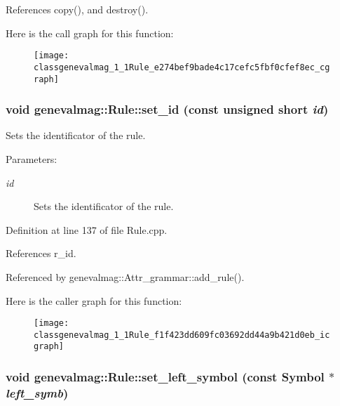 References copy(), and destroy().

Here is the call graph for this function:\nopagebreak
\begin{figure}[H]
\begin{center}
\leavevmode
\texttt{[image: classgenevalmag\_1\_1Rule\_e274bef9bade4c17cefc5fbf0cfef8ec\_cgraph]}
\end{center}
\end{figure}
\hypertarget{classgenevalmag_1_1Rule_f1f423dd609fc03692dd44a9b421d0eb}{
\subsubsection[{set\_\-id}]{\setlength{\rightskip}{0pt plus 5cm}void genevalmag::Rule::set\_\-id (const unsigned short {\em id})}}
\label{classgenevalmag_1_1Rule_f1f423dd609fc03692dd44a9b421d0eb}


Sets the identificator of the rule. \begin{Desc}
\item[Parameters:]
\begin{description}
\item[{\em id}]Sets the identificator of the rule. \end{description}
\end{Desc}


Definition at line 137 of file Rule.cpp.

References r\_\-id.

Referenced by genevalmag::Attr\_\-grammar::add\_\-rule().

Here is the caller graph for this function:\nopagebreak
\begin{figure}[H]
\begin{center}
\leavevmode
\texttt{[image: classgenevalmag\_1\_1Rule\_f1f423dd609fc03692dd44a9b421d0eb\_icgraph]}
\end{center}
\end{figure}
\hypertarget{classgenevalmag_1_1Rule_adb73aec92b549b69e2a46c5d0fb0c02}{
\subsubsection[{set\_\-left\_\-symbol}]{\setlength{\rightskip}{0pt plus 5cm}void genevalmag::Rule::set\_\-left\_\-symbol (const {\bf Symbol} $\ast$ {\em left\_\-symb})}}
\label{classgenevalmag_1_1Rule_adb73aec92b549b69e2a46c5d0fb0c02}


